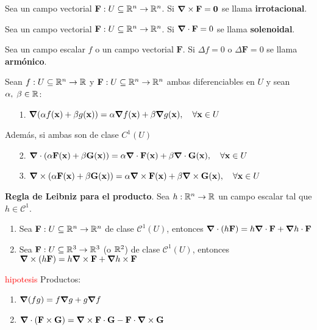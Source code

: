 \begin{definition}
    Sea un campo vectorial $\mathbf{F}:U\subseteq\mathbb{R}^n\to\mathbb{R}^n$.  Si $\grad\times\mathbf{F}=\mathbf{0}$ se llama  \textbf{irrotacional}.
  \end{definition}  
  
  
  \begin{definition} Sea un campo vectorial $\mathbf{F}:U\subseteq\mathbb{R}^n\to\mathbb{R}^n$.
     Si $\grad\cdot\mathbf{F}=0$  se llama  \textbf{solenoidal}.
\end{definition}
\begin{definition}
    Sea un campo escalar $f$ o un campo vectorial $\mathbf{F}$. Si $\Delta f=0$ o $\Delta \mathbf{F}=0$  se llama  \textbf{arm\'onico}.
\end{definition}

\begin{propertie}
    Sean $f:U\subseteq\mathbb{R}^n\to\mathbb{R}$  y $\mathbf{F}:U\subseteq\mathbb{R}^n\to\mathbb{R}^n$  ambas diferenciables en $U$ y sean $\alpha,\;\beta\in\mathbb{R}$:
    \begin{itemize}
        \item[1.] \(\grad(\alpha f(\mathbf{x})+\beta g(\mathbf{x}))=\alpha\grad f(\mathbf{x})+\beta\grad g(\mathbf{x}),\quad\forall\mathbf{x}\in U\) 
     \end{itemize}   
 
\:\:\:\:  Adem\'as, si ambas son de clase $C^{1}(U)$ 
       \begin{itemize}
        \item[2.]  \(\grad\cdot(\alpha \mathbf{F}(\mathbf{x})+\beta \mathbf{G}(\mathbf{x}))=\alpha\grad\cdot\mathbf{F}(\mathbf{x})+\beta\grad\cdot\mathbf{G}(\mathbf{x}),\quad\forall\mathbf{x}\in U\)
        \item[3.] \(\grad\times(\alpha \mathbf{F}(\mathbf{x})+\beta \mathbf{G}(\mathbf{x}))=\alpha\grad\times\mathbf{F}(\mathbf{x})+\beta\grad\times\mathbf{G}(\mathbf{x}),\quad\forall\mathbf{x}\in U\)
    \end{itemize}
\end{propertie}
\begin{propertie}
    \textbf{Regla de Leibniz para el producto}. Sea $h:\mathbb{R}^n\to\mathbb{R}$ un campo escalar tal que $h\in \mathcal{C}^1$.
    \begin{enumerate}
        \item Sea $\mathbf{F}:U\subseteq\mathbb{R}^n\to\mathbb{R}^n$ de clase $\mathcal{C}^1(U)$, entonces $\grad\cdot(h\mathbf{F})=h\grad\cdot\mathbf{F}+\grad h\cdot\mathbf{F}$
        \item Sea $\mathbf{F}:U\subseteq\mathbb{R}^3\to\mathbb{R}^3$ (o $\mathbb{R}^2$) de clase $\mathcal{C}^1(U)$, entonces $\grad\times(h\mathbf{F})=h\grad\times\mathbf{F}+\grad h\times\mathbf{F}$
    \end{enumerate}
\end{propertie}
\begin{propertie} \textcolor{red}{hipotesis}
    Productos:
    \begin{enumerate}
        \item $\grad(fg)=f\grad g+g\grad f$
        \item $\grad\cdot(\mathbf{F}\times\mathbf{G})=\grad\times\mathbf{F}\cdot\mathbf{G}-\mathbf{F}\cdot\grad\times\mathbf{G}$
    \end{enumerate}
\end{propertie}